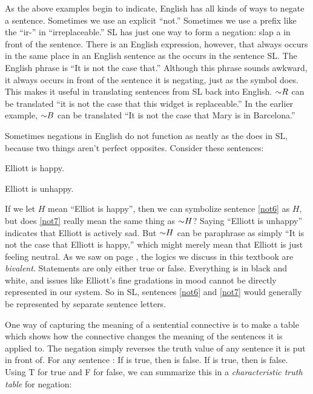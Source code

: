 As the above examples begin to indicate, English has all kinds of ways to negate a sentence.  Sometimes we use an explicit ``not.'' Sometimes we use a prefix like the ``ir-'' in ``irreplaceable.'' SL has just one way to form a negation: slap a \enot in front of the sentence. There is an English expression, however, that always occurs in the same place in an English sentence as the \enot occurs in the sentence SL. The English phrase is ``It is not the case that.'' Although this phrase sounds awkward, it always occurs in front of the sentence it is negating, just as the symbol \enot does. This makes it useful in translating sentences from SL back into English. $\mathord{\sim} R$ can be translated ``it is not the case that this widget is replaceable.'' In the earlier example, $\mathord{\sim} B$ can be translated ``It is not the case that Mary is in Barcelona.''


Sometimes negations in English do not function as neatly as the \enot does in SL, because two things aren't perfect opposites. Consider these sentences:

\begin{earg}
\item[\ex{not6}] Elliott is happy.
\item[\ex{not7}] Elliott is unhappy.
\end{earg}


If we let $H$ mean ``Elliot is happy'', then we can symbolize sentence \ref{not6} as $H$, but does \ref{not7} really mean the same thing as $\mathord{\sim} H$? Saying ``Elliott is unhappy'' indicates that Elliott is actively sad. But $\mathord{\sim} H$ can be paraphrase as simply ``It is not the case that Elliott is happy,'' which might merely mean that Elliott is just feeling neutral. As we saw on page \pageref{def:bivalent}, the logics we discuss in this textbook are \emph{bivalent}. Statements are only either true or false. Everything is in black and white, and issues like Elliott's fine gradations in mood cannot be directly represented in our system. So in SL, sentences \ref{not6} and  \ref{not7} would generally be represented by separate sentence letters.

One way of capturing the meaning of a sentential connective is to make a table which shows how the connective changes the meaning of the sentences it is applied to. The negation simply reverses the truth value of any sentence it is put in front of. For any sentence : If  is true, then \enot{} is false. If \enot{} is true, then  is false. Using T for true and F for false, we can summarize this in a \emph{characteristic truth table} for negation:

